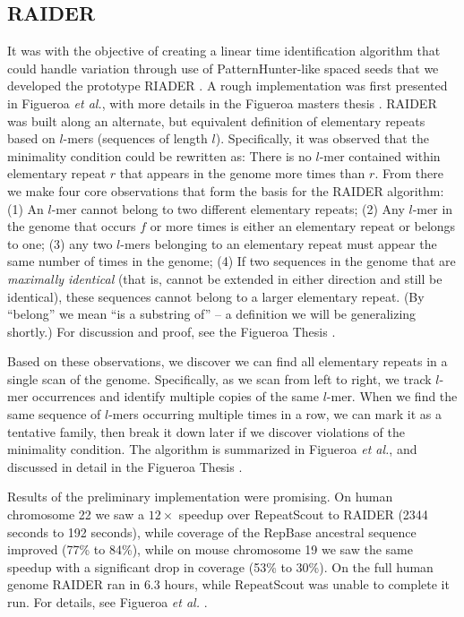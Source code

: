 \documentclass{bmcart}
\begin{document}
\subsection*{RAIDER}
\label{RAIDERSec}
It was with the objective of creating a linear time identification
algorithm that could handle variation through use of
PatternHunter-like spaced seeds that we developed the prototype RIADER
\cite{Li:2004wl}.  A rough implementation was first presented in
Figueroa {\it et al.}, with more details in the Figueroa masters
thesis \cite{Figueroa:2014uk,Figueroa:2013cz}.  RAIDER was built along
an alternate, but equivalent definition of elementary repeats based on
$l$-mers (sequences of length $l$).  Specifically, it was observed
that the minimality condition could be rewritten as: There is no
$l$-mer contained within elementary repeat $r$ that appears in the
genome more times than $r$.  From there we make four core observations
that form the basis for the RAIDER algorithm: (1) An $l$-mer cannot
belong to two different elementary repeats; (2) Any $l$-mer in the
genome that occurs $f$ or more times is either an elementary repeat or
belongs to one; (3) any two $l$-mers belonging to an elementary repeat
must appear the same number of times in the genome; (4) If two
sequences in the genome that are {\it maximally identical} (that is,
cannot be extended in either direction and still be identical), these
sequences cannot belong to a larger elementary repeat.  (By ``belong''
we mean ``is a substring of'' -- a definition we will be generalizing
shortly.)  For discussion and proof, see the Figueroa Thesis
\cite{Figueroa:2013cz}.

Based on these observations, we discover we can find all elementary
repeats in a single scan of the genome.  Specifically, as we scan from
left to right, we track $l$-mer occurrences and identify multiple
copies of the same $l$-mer.  When we find the same sequence of $l$-mers
occurring multiple times in a row, we can mark it as a tentative family,
then break it down later if we discover violations of the minimality
condition.  The algorithm is summarized in Figueroa {\it et al.}, and
discussed in detail in the Figueroa Thesis \cite{Figueroa:2014uk,Figueroa:2013cz}.

Results of the preliminary implementation were promising. On human
chromosome 22 we saw a $12\times$ speedup over RepeatScout to RAIDER
(2344 seconds to 192 seconds), while coverage of the RepBase
\cite{Jurka:2005bl} ancestral sequence improved (77\% to 84\%), while
on mouse chromosome 19 we saw the same speedup with a significant drop
in coverage (53\% to 30\%).  On the full human genome RAIDER ran in
$6.3$ hours, while RepeatScout was unable to complete it run.  For
details, see Figueroa {\it et al.} \cite{Figueroa:2014uk}.
\end{document}
